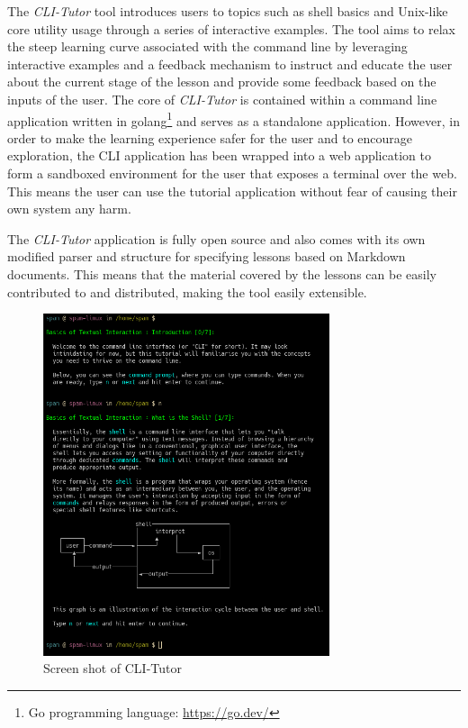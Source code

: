 The \textit{CLI-Tutor} tool introduces users to topics such as shell basics and
Unix-like core utility usage through a series of interactive examples. The tool
aims to relax the steep learning curve associated with the command line by
leveraging interactive examples and a feedback mechanism to instruct and
educate the user about the current stage of the lesson and provide some
feedback based on the inputs of the user. The core of \textit{CLI-Tutor} is
contained within a command line application written in golang\footnote{Go
	programming language: \href{https://go.dev/}{https://go.dev/}} and serves as a
standalone application. However, in order to make the learning experience safer
for the user and to encourage exploration, the CLI application has been wrapped
into a web application to form a sandboxed environment for the user that
exposes a terminal over the web. This means the user can use the tutorial
application without fear of causing their own system any harm.

The \textit{CLI-Tutor} application is fully open source and also comes with its
own modified parser and structure for specifying lessons based on Markdown
documents. This means that the material covered by the lessons can be easily
contributed to and distributed, making the tool easily extensible.


\begin{figure}[H]
	\centering
	\includegraphics[width=0.75\textwidth]{img/clitutor}
	\caption{Screen shot of CLI-Tutor}
	\label{fig:clitutor}
\end{figure}

